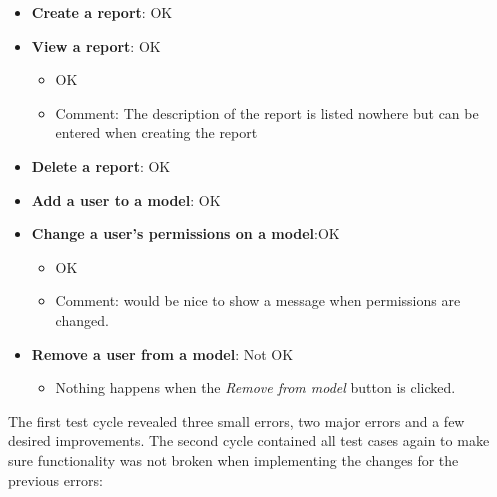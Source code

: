 \begin{itemize}
\begin{itemize}
    \end{itemize}
    \item \textbf{Create a report}: \textcolor{mutedGreen}{OK}
    \item \textbf{View a report}: \textcolor{mutedGreen}{OK}
    \begin{itemize}
        \item OK
        \item Comment: The description of the report is listed nowhere but can be entered when creating the report
    \end{itemize}
    \item \textbf{Delete a report}: \textcolor{mutedGreen}{OK}
    \item \textbf{Add a user to a model}: \textcolor{mutedGreen}{OK}
    \item \textbf{Change a user's permissions on a model}:\textcolor{mutedGreen}{OK}
    \begin{itemize}
        \item OK
        \item Comment: would be nice to show a message when permissions are changed.
    \end{itemize}
    \item \textbf{Remove a user from a model}: \textcolor{mutedPeach}{Not OK}
    \begin{itemize}
        \item Nothing happens when the \textit{Remove from model} button is clicked.
    \end{itemize}
\end{itemize}

The first test cycle revealed three small errors, two major errors and a few desired improvements.
The second cycle contained all test cases again to make sure functionality was not broken when implementing the changes for the previous errors:

